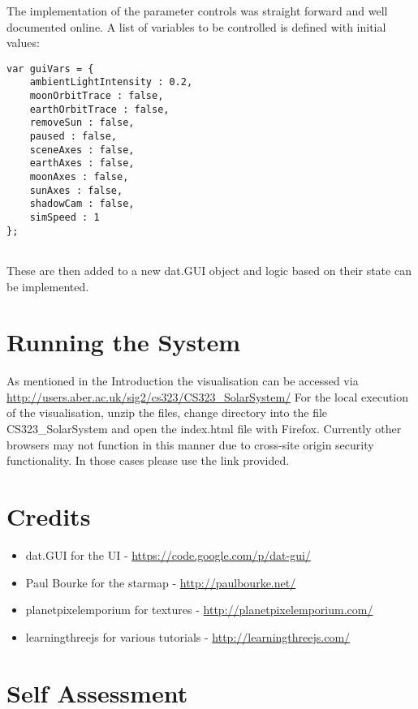 \documentclass[titlepage]{article}
\begin{document}
The implementation of the parameter controls was straight forward and well documented online. A list of variables to be controlled is defined with initial values:
\FloatBarrier
\begin{lstlisting}[caption=Code taken from main.js]
var guiVars = {
    ambientLightIntensity : 0.2,
    moonOrbitTrace : false,
    earthOrbitTrace : false,
    removeSun : false,
    paused : false,
    sceneAxes : false,
    earthAxes : false,
    moonAxes : false,
    sunAxes : false,
    shadowCam : false,
    simSpeed : 1
};


\end{lstlisting}

These are then added to a new dat.GUI object and logic based on their state can be implemented.
\section{Running the System}
As mentioned in the Introduction the visualisation can be accessed via \url{http://users.aber.ac.uk/sig2/cs323/CS323\_SolarSystem/}
For the local execution of the visualisation, unzip the files, change directory into the file CS323\_SolarSystem and open the index.html file with Firefox.  Currently other browsers may not function in this manner due to cross-site origin security functionality. In those cases please use the link provided.
\section{Credits}

\begin{itemize}
\item dat.GUI for the UI  - \url{https://code.google.com/p/dat-gui/}
\item Paul Bourke for the starmap - \url{http://paulbourke.net/}
\item planetpixelemporium for textures - \url{http://planetpixelemporium.com/}
\item learningthreejs for various tutorials - \url{http://learningthreejs.com/}
\end{itemize}

\section{Self Assessment}
\end{document}
